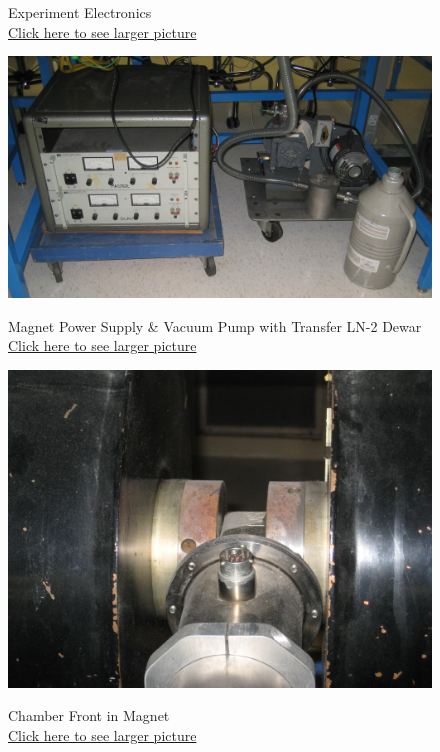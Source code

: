 \documentclass{../lab}
\begin{document}
\begin{figure}[!htb]
  \caption{Experiment Electronics \\
  \href{http://experimentationlab.berkeley.edu/sites/default/files/images/SHE_Electronics_3546_Crop.jpg}{Click here to see larger picture}}
  \label{fig:SHE_Electronics_3546_Crop.jpg}
\endminipage\hfill
{}
  \href{http://experimentationlab.berkeley.edu/sites/default/files/images/SHE_Mag_Pwr_Crop_3547.jpg}{\includegraphics[width=\linewidth,keepaspectratio]{images/SHE_Mag_Pwr_Crop_3547.jpg}}
  \caption{Magnet Power Supply \& Vacuum Pump with Transfer LN-2 Dewar \\ \href{http://experimentationlab.berkeley.edu/sites/default/files/images/SHE_Mag_Pwr_Crop_3547.jpg}{Click here to see larger picture}}\label{fig:SHE_Mag_Pwr_Crop_3547.jpg}
\endminipage\hfill
{}
  \href{http://experimentationlab.berkeley.edu/sites/default/files/images/Chamber_Front_3304.jpg}{\includegraphics[width=\linewidth,keepaspectratio]{images/Chamber_Front_3304.jpg}}
  \caption{Chamber Front in Magnet \\ \href{http://experimentationlab.berkeley.edu/sites/default/files/images/Chamber_Front_3304.jpg}{Click here to see larger picture}}\label{fig:Chamber_Front_3304.jpg}
\endminipage
\end{figure}
\end{document}
